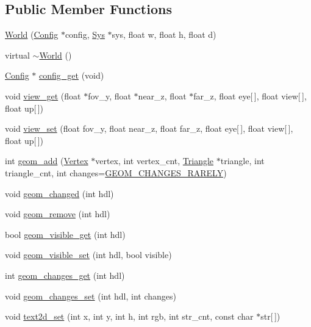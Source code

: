 \subsection*{Public Member Functions}
\begin{DoxyCompactItemize}
\item 
\mbox{\hyperlink{classWorld_ab50208fdc8cf13d49174777ed262f507}{World}} (\mbox{\hyperlink{classConfig}{Config}} $\ast$config, \mbox{\hyperlink{classSys}{Sys}} $\ast$sys, float w, float h, float d)
\item 
virtual \mbox{\hyperlink{classWorld_a9ce9875f5e35e293661857e4a2c1d2e4}{$\sim$\+World}} ()
\item 
\mbox{\hyperlink{classConfig}{Config}} $\ast$ \mbox{\hyperlink{classWorld_a4a9bea32a941252d8148a3c383c42562}{config\+\_\+get}} (void)
\item 
void \mbox{\hyperlink{classWorld_a407ac00a586fc5ee94229c254c114f93}{view\+\_\+get}} (float $\ast$fov\+\_\+y, float $\ast$near\+\_\+z, float $\ast$far\+\_\+z, float eye\mbox{[}$\,$\mbox{]}, float view\mbox{[}$\,$\mbox{]}, float up\mbox{[}$\,$\mbox{]})
\item 
void \mbox{\hyperlink{classWorld_a5fc20fdaf09120411c98d7a862be604a}{view\+\_\+set}} (float fov\+\_\+y, float near\+\_\+z, float far\+\_\+z, float eye\mbox{[}$\,$\mbox{]}, float view\mbox{[}$\,$\mbox{]}, float up\mbox{[}$\,$\mbox{]})
\item 
int \mbox{\hyperlink{classWorld_acc924235d8d421ecd32d8c7b813b486e}{geom\+\_\+add}} (\mbox{\hyperlink{classVertex}{Vertex}} $\ast$vertex, int vertex\+\_\+cnt, \mbox{\hyperlink{classTriangle}{Triangle}} $\ast$triangle, int triangle\+\_\+cnt, int changes=\mbox{\hyperlink{World_8h_adf764cbdea00d65edcd07bb9953ad2b7afd62cb9ff74dd66a2597e9c31e205cba}{G\+E\+O\+M\+\_\+\+C\+H\+A\+N\+G\+E\+S\+\_\+\+R\+A\+R\+E\+LY}})
\item 
void \mbox{\hyperlink{classWorld_ac3b4194ef3dcc248f00070c8c9d9f27d}{geom\+\_\+changed}} (int hdl)
\item 
void \mbox{\hyperlink{classWorld_a2db9c56bf981177a1cb035178caa13e4}{geom\+\_\+remove}} (int hdl)
\item 
bool \mbox{\hyperlink{classWorld_ae7d794357e0c615948ea1b323f1cc0b7}{geom\+\_\+visible\+\_\+get}} (int hdl)
\item 
void \mbox{\hyperlink{classWorld_ac59b8559fb117042c25a2f5da0547e33}{geom\+\_\+visible\+\_\+set}} (int hdl, bool visible)
\item 
int \mbox{\hyperlink{classWorld_ad5feb02e4ca180496f87df564a2e16ab}{geom\+\_\+changes\+\_\+get}} (int hdl)
\item 
void \mbox{\hyperlink{classWorld_a1c541fb161f7320e9e2c7dedf38617fc}{geom\+\_\+changes\+\_\+set}} (int hdl, int changes)
\item 
void \mbox{\hyperlink{classWorld_a1da19e0ccde7acfa708cf1f0054dcb3c}{text2d\+\_\+set}} (int x, int y, int h, int rgb, int str\+\_\+cnt, const char $\ast$str\mbox{[}$\,$\mbox{]})
\end{DoxyCompactItemize}
